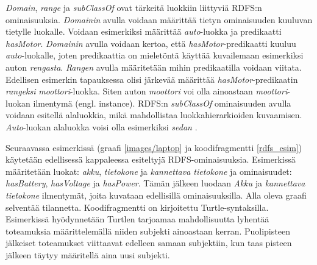 \documentclass[finnish, 12pt, a4paper, elec, utf8, pdfa, online]{aaltothesis}
\begin{document}
{\textit{Domain}, \textit{range} ja \textit{subClassOf} ovat tärkeitä luokkiin liittyviä RDFS:n ominaisuuksia. \textit{Domainin} avulla voidaan määrittää tietyn ominaisuuden kuuluvan tietylle luokalle. Voidaan esimerkiksi määrittää \textit{auto}-luokka ja predikaatti \textit{hasMotor}. \textit{Domainin} avulla voidaan kertoa, että \textit{hasMotor}-predikaatti kuuluu \textit{auto}-luokalle, joten predikaattia on mieletöntä käyttää kuvailemaan esimerkiksi auton \textit{rengasta}. \textit{Rangen} avulla määritetään mihin predikaatilla voidaan viitata. Edellisen esimerkin tapauksessa olisi järkevää määrittää \textit{hasMotor}-predikaatin \textit{rangeksi} \textit{moottori}-luokka. Siten auton \textit{moottori} voi olla ainoastaan \textit{moottori}-luokan ilmentymä (engl. instance). RDFS:n \textit{subClassOf} ominaisuuden avulla voidaan esitellä alaluokkia, mikä mahdollistaa luokkahierarkioiden kuvaamisen. \textit{Auto}-luokan alaluokka voisi olla esimerkiksi \textit{sedan}
\cite{W3C_RDFS2}.

Seuraavassa esimerkissä (graafi \ref{images/laptop} ja koodifragmentti \ref{rdfs_esim}) käytetään edellisessä kappaleessa esiteltyjä RDFS-ominaisuuksia. Esimerkissä määritetään luokat: \textit{akku}, \textit{tietokone} ja \textit{kannettava tietokone} ja ominaisuudet: \textit{hasBattery}, \textit{hasVoltage} ja \textit{hasPower}. Tämän jälkeen luodaan \textit{Akku} ja \textit{kannettava tietokone} ilmentymät, joita kuvataan edellisillä ominaisuuksilla. Alla oleva graafi selventää tilannetta. Koodifragmentti on kirjoitettu Turtle-syntaksilla. Esimerkissä hyödynnetään Turtlen tarjoamaa mahdollisuutta lyhentää toteamuksia määrittelemällä niiden subjekti ainoastaan kerran. Puolipisteen jälkeiset toteamukset viittaavat edelleen samaan subjektiin, kun taas pisteen jälkeen täytyy määritellä aina uusi subjekti.

}
\end{document}

